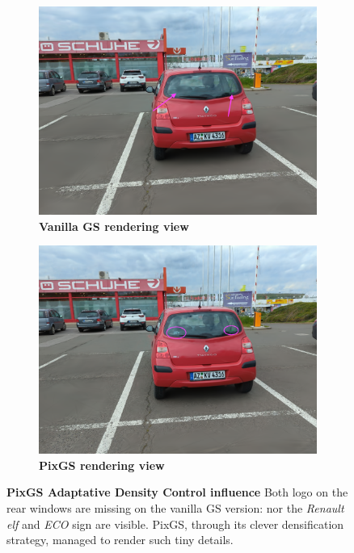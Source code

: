 \begin{figure}[htb!]
  \centering
  \begin{subfigure}[b]{0.45\linewidth}
    \includegraphics[width=\linewidth]{images/gaussiansplatting/00029-gs.png}
    \caption{\textbf{Vanilla GS rendering view}}
    \label{fig:view3}
  \end{subfigure}
  \quad %
  \begin{subfigure}[b]{0.45\linewidth}
    \includegraphics[width=\linewidth]{images/gaussiansplatting/00029-pixgs.png}
    \caption{\textbf{PixGS rendering view}}
    \label{fig:gs-view3-gs}
  \end{subfigure}
  \caption{\textbf{PixGS Adaptative Density Control influence} Both logo on the rear windows are missing on the vanilla GS version: nor the \textit{Renault elf} and \textit{ECO} sign are visible. PixGS, through its clever densification strategy, managed to render such tiny details.}
  \label{fig:gs-pigs}
\end{figure}

